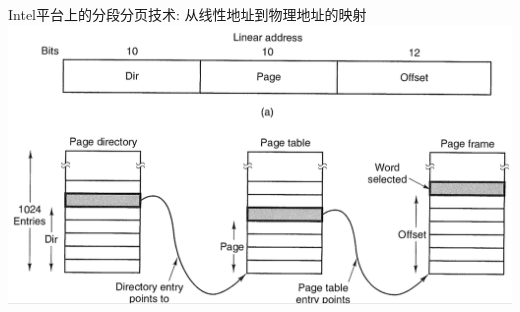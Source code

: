 \documentclass[xcolor=svgnames]{beamer}
\begin{document}
\begin{CJK*}{UTF8}{gbsn}
\begin{frame}{Intel平台上的分段分页技术: 从线性地址到物理地址的映射}
\includegraphics[width=1.0\textwidth]{pmap.png}
\end{frame}




%

%


\end{CJK*}
\end{document}
